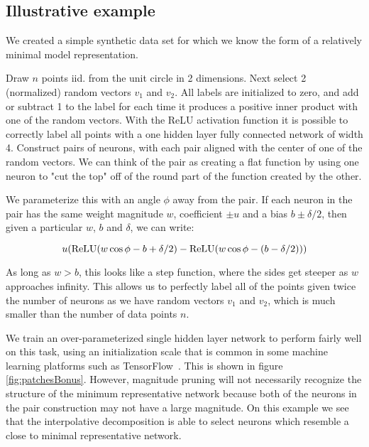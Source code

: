 \subsection{Illustrative example}


We created a simple synthetic data set for which we know the form of a relatively minimal model representation.

Draw $n$ points iid. from the unit circle in 2 dimensions.
Next select 2 (normalized) random vectors $v_1$ and $v_2$.
All labels are initialized to zero, and add or subtract 1 to the label for each time it produces a positive inner product with one of the random vectors.
With the ReLU activation function it is possible to correctly label all points with a one hidden layer fully connected network of width 4.
Construct pairs of neurons, with each pair aligned with the center of one of the random vectors.  We can think of the pair as creating a flat function by using one neuron to "cut the top" off of the round part of the function created by the other.

We parameterize this with an angle $\phi$ away from the pair. If each neuron in the pair has the same weight magnitude $w$, coefficient $\pm u$ and a bias $b \pm \delta/2$, then given a particular $w$, $b$ and $\delta$, we can write:

\begin{equation*}
       u ({\operatorname{ReLU}( w \cos \phi -b +\delta/2)- \operatorname{ReLU}(w \cos \phi -(b-\delta/2))})
\end{equation*}

As long as $w>b$, this looks like a step function, where the sides get steeper as $w$ approaches infinity.  This allows us to perfectly label all of the points given twice the number of neurons as we have random vectors $v_1$ and $v_2$, which is much smaller than the number of data points $n$.

We train an over-parameterized single hidden layer network to perform fairly well on this task, using an initialization scale that is common in some machine learning platforms such as TensorFlow~\cite{tensorflow2015-whitepaper}. This is shown in figure \ref{fig:patchesBonus}.  
However, magnitude pruning will not necessarily recognize the structure of the minimum representative network because both of the neurons in the pair construction may not have a large magnitude.
On this example we see that the interpolative decomposition is able to select neurons which resemble a close to minimal representative network.  

